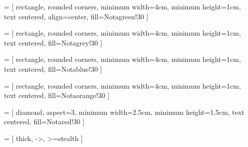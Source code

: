 \usepackage{tikz}
\usetikzlibrary{shapes.geometric, arrows}

 = [
    rectangle, rounded corners, 
    minimum width=4cm, 
    minimum height=1cm,
    text centered,  
    align=center,
    fill=Notagreen!30
]

 = [
    rectangle, rounded corners, 
    minimum width=4cm, 
    minimum height=1cm,
    text centered,  
    fill=Notagrey!30
]

 = [
    rectangle, rounded corners, 
    minimum width=4cm, 
    minimum height=1cm, 
    text centered, 
    fill=Notablue!30
]

 = [
    rectangle, rounded corners, 
    minimum width=4cm, 
    minimum height=1cm, 
    text centered, 
    fill=Notaorange!30
]

 = [
    diamond,
    aspect=3,
    minimum width=2.5cm, 
    minimum height=1.5cm, 
    text centered, 
    fill=Notared!30
]

 = [
    thick,
    ->,
    >=stealth
]